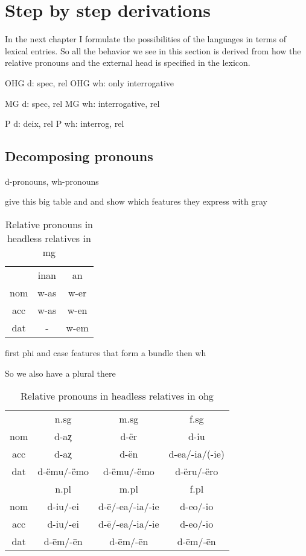 
\chapter{Step by step derivations}

In the next chapter I formulate the possibilities of the languages in terms of lexical entries. So all the behavior we see in this section is derived from how the relative pronouns and the external head is specified in the lexicon.

OHG d: spec, rel
OHG wh: only interrogative

MG d: spec, rel
MG wh: interrogative, rel

P d: deix, rel
P wh: interrog, rel

\section{Decomposing pronouns}

d-pronouns, wh-pronouns

give this big table and and show which features they express with gray

\begin{table}[H]
 \center
 \caption {Relative pronouns in headless relatives in \ac{mg}}
  \begin{tabular}{ccc}
  \toprule
       & \ac{inan} & \ac{an} \\
        \cmidrule{2-3}
    \ac{nom}  & w-as     & w-er    \\
    \ac{acc}  & w-as     & w-en   \\
    \ac{dat}  & -        & w-em    \\
  \bottomrule
  \end{tabular}
\end{table}

first phi and case features that form a bundle
then wh


So we also have a plural there

\begin{table}[H]\label{tbl:paradigmohg}
 \center
 \caption {Relative pronouns in headless relatives in \ac{ohg}}
  \begin{tabular}{cccc}
  \toprule
       & \ac{n}.\ac{sg} & \ac{m}.\ac{sg}  & \ac{f}.\ac{sg} \\
        \cmidrule{2-4}
  \ac{nom} & d-aȥ           & d-ër          & d-iu      \\
  \ac{acc} & d-aȥ        & d-ën      & d-ea/-ia/(-ie) \\
  \ac{dat} & d-ëmu/-ëmo     & d-ëmu/-ëmo   & d-ëru/-ëro   \\
  \bottomrule
         & \ac{n}.\ac{pl} & \ac{m}.\ac{pl}   & \ac{f}.\ac{pl} \\
          \cmidrule{2-4}
    \ac{nom}  & d-iu/-ei      &  d-ē/-ea/-ia/-ie & d-eo/-io        \\
    \ac{acc}  & d-iu/-ei      &  d-ē/-ea/-ia/-ie & d-eo/-io        \\
    \ac{dat}  & d-ēm/-ēn      &  d-ēm/-ēn        & d-ēm/-ēn        \\
    \bottomrule
  \end{tabular}
\end{table}

